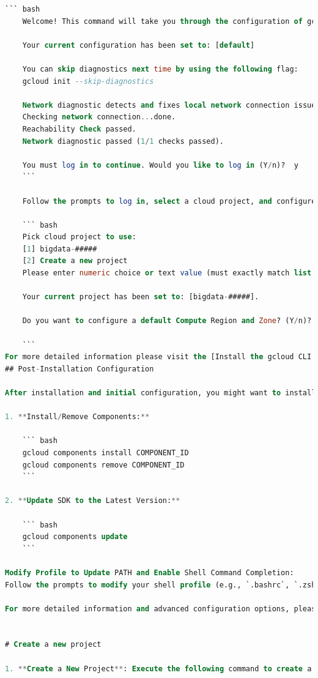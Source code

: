 \documentclass{article}
\begin{document}
\begin{lstlisting}[language=sql,caption={bash version}]
    ``` bash 
    Welcome! This command will take you through the configuration of gcloud.

    Your current configuration has been set to: [default]

    You can skip diagnostics next time by using the following flag:
    gcloud init --skip-diagnostics

    Network diagnostic detects and fixes local network connection issues.
    Checking network connection...done.
    Reachability Check passed.
    Network diagnostic passed (1/1 checks passed).

    You must log in to continue. Would you like to log in (Y/n)?  y
    ```

    Follow the prompts to log in, select a cloud project, and configure a default compute region and zone if desired.

    ``` bash
    Pick cloud project to use:
    [1] bigdata-#####
    [2] Create a new project
    Please enter numeric choice or text value (must exactly match list item):  2

    Your current project has been set to: [bigdata-#####].

    Do you want to configure a default Compute Region and Zone? (Y/n)?  y

    ```
For more detailed information please visit the [Install the gcloud CLI ](https://cloud.google.com/sdk/docs/install)
## Post-Installation Configuration

After installation and initial configuration, you might want to install additional components or update your SDK:

1. **Install/Remove Components:**

    ``` bash
    gcloud components install COMPONENT_ID
    gcloud components remove COMPONENT_ID
    ```

2. **Update SDK to the Latest Version:**

    ``` bash
    gcloud components update
    ```

Modify Profile to Update PATH and Enable Shell Command Completion:
Follow the prompts to modify your shell profile (e.g., `.bashrc`, `.zshrc`).

For more detailed information and advanced configuration options, please visit the [Google Cloud SDK Quickstarts](https://cloud.google.com/storage/docs/gsutil/commands/config).


# Create a new project

1. **Create a New Project**: Execute the following command to create a new project:


\end{lstlisting}
\end{document}
